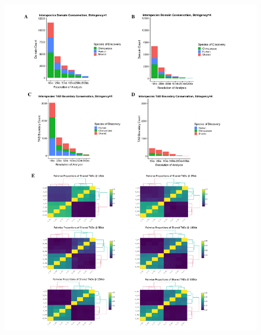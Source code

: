 \begin{figure}[!htb]
\label{fig:ch02-figS13}
\end{figure}

\begin{figure}[!htb]
\centering
\includegraphics[width=6in]{img/figS14.pdf}

\end{figure}
